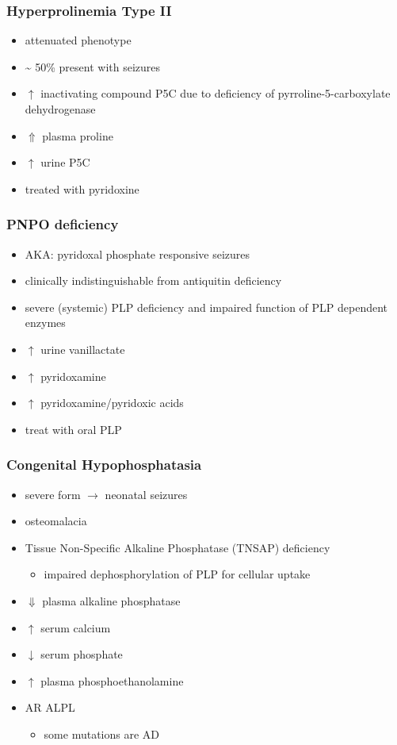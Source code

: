 \documentclass{scrartcl}
\begin{document}
\subsubsection{Hyperprolinemia Type II}
\label{sec:org678bf01}
\begin{itemize}
\item attenuated phenotype
\item \textasciitilde{} 50\% present with seizures
\item \(\uparrow\) inactivating compound P5C due to deficiency of pyrroline-5-carboxylate dehydrogenase
\item \(\Uparrow\) plasma proline
\item \(\uparrow\) urine P5C
\item treated with pyridoxine
\end{itemize}

\subsubsection{PNPO deficiency}
\label{sec:orgad56bf8}
\begin{itemize}
\item AKA: pyridoxal phosphate responsive seizures
\item clinically indistinguishable from antiquitin deficiency
\item severe (systemic) PLP deficiency and impaired function of PLP
dependent enzymes
\item \(\uparrow\) urine vanillactate
\item \(\uparrow\) pyridoxamine
\item \(\uparrow\) pyridoxamine/pyridoxic acids
\item treat with oral PLP
\end{itemize}

\subsubsection{Congenital Hypophosphatasia}
\label{sec:orgce8f1ab}
\begin{itemize}
\item severe form \(\to\) neonatal seizures
\item osteomalacia
\item Tissue Non-Specific Alkaline Phosphatase (TNSAP) deficiency
\begin{itemize}
\item impaired dephosphorylation of PLP for cellular uptake
\end{itemize}
\item \(\Downarrow\) plasma alkaline phosphatase
\item \(\uparrow\) serum calcium
\item \(\downarrow\) serum phosphate
\item \(\uparrow\) plasma phosphoethanolamine
\item AR ALPL
\begin{itemize}
\item some mutations are AD
\end{itemize}
\end{itemize}
\end{document}
